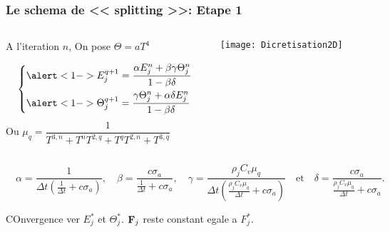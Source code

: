 \begin{frame}
  \frametitle{Le schema de << splitting >>: Etape 1}
  \begin{columns}
    \begin{column}{0.5\textwidth}
     A l'iteration $n$, On pose $\Theta = aT^4$

      \begingroup
      \normalsize
      \begin{equation*} 
        \begin{dcases}
         \alert<1->{E_j^{q+1} = \dfrac{\alpha E_j^n + \beta \gamma \Theta_j^n}{1 - \beta \delta}} \\
         \alert<1->{\Theta_j^{q+1} = \dfrac{\gamma \Theta_j^n + \alpha \delta E_j^n}{1 - \beta \delta}}
        \end{dcases}
    \label{eqn:Step1}
    \end{equation*}
      \endgroup
      Ou
      \tiny
      $\mu_q = \dfrac{1}{T^{3,n} + T^{n}T^{2,q} + T^{q}T^{2,n} + T^{3,q}}$
      \normalsize
    \end{column}
    \begin{column}{0.5\textwidth}
       \begin{center}
        \texttt{[image: Dicretisation2D]}       
       \end{center}
    \end{column}
   \end{columns}
   \tiny
  $\quad  \alpha = \dfrac{1}{\Delta t \left( \frac{1}{\Delta t} + c \sigma_a \right)} ,\quad 
   \beta = \dfrac{c \sigma_a}{\frac{1}{\Delta t} + c \sigma_a} ,\quad 
   \gamma = \dfrac{\rho_j C_v \mu_q}{\Delta t \left( \frac{\rho_j C_v \mu_q}{\Delta t} + c \sigma_a \right)} \quad \text{et} \quad  
   \delta = \dfrac{c \sigma_a}{\frac{\rho_j C_v \mu_q}{\Delta t} + c \sigma_a}.$

   \normalsize
   COnvergence ver $E_j^*$ et $\Theta_j^*$. $\mathbf{F}_j$ reste constant egale a $F_j^*$.
   
\end{frame}


